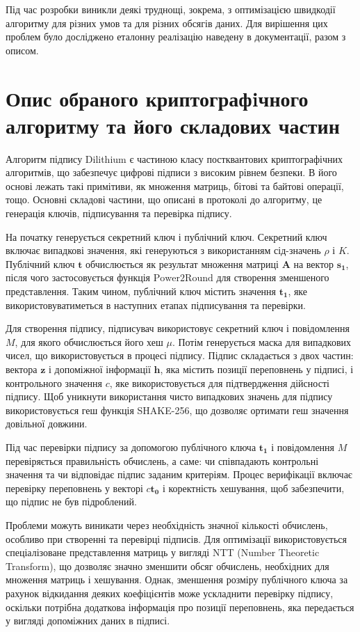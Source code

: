 \documentclass[12pt]{HomusWorkus}
\begin{document}
Під час розробки виникли деякі труднощі, зокрема, з оптимізацією швидкодії алгоритму для різних умов та для різних обсягів даних. Для вирішення цих проблем було досліджено еталонну реалізацію наведену в документації, разом з описом.

\section{Опис обраного криптографiчного алгоритму та його складових частин}

Алгоритм підпису Dilithium є частиною класу постквантових криптографічних алгоритмів, що забезпечує цифрові підписи з високим рівнем безпеки. В його основі лежать такі примітиви, як множення матриць, бітові та байтові операції, тощо. Основні складові частини, що описані в протоколі до алгоритму, це генерація ключів, підписування та перевірка підпису.

На початку генерується секретний ключ і публічний ключ. Секретний ключ включає випадкові значення, які генеруються з використанням сід-значень $\rho$ і $K$. Публічний ключ $\mathbf{t}$ обчислюється як результат множення матриці $\mathbf{A}$ на вектор $\mathbf{s_1}$, після чого застосовується функція $\mathrm{Power2Round}$ для створення зменшеного представлення. Таким чином, публічний ключ містить значення $\mathbf{t_1}$, яке використовуватиметься в наступних етапах підписування та перевірки.

Для створення підпису, підписувач використовує секретний ключ і повідомлення $M$, для якого обчислюється його хеш $\mu$. Потім генерується маска для випадкових чисел, що використовується в процесі підпису. Підпис складається з двох частин: вектора $\mathbf{z}$ і допоміжної інформації $\mathbf{h}$, яка містить позиції переповнень у підписі, і контрольного значення $c$, яке використовується для підтвердження дійсності підпису. Щоб уникнути використання чисто випадкових значень для підпису використовується геш функція SHAKE-256, що дозволяє ортимати геш значення довільної довжини.

Під час перевірки підпису за допомогою публічного ключа $\mathbf{t_1}$ і повідомлення $M$ перевіряється правильність обчислень, а саме: чи співпадають контрольні значення та чи відповідає підпис заданим критеріям. Процес верифікації включає перевірку переповнень у векторі $c\mathbf{t_0}$ і коректність хешування, щоб забезпечити, що підпис не був підроблений.

Проблеми можуть виникати через необхідність значної кількості обчислень, особливо при створенні та перевірці підписів. Для оптимізації використовується спеціалізоване представлення матриць у вигляді NTT (Number Theoretic Transform), що дозволяє значно зменшити обсяг обчислень, необхідних для множення матриць і хешування. Однак, зменшення розміру публічного ключа за рахунок відкидання деяких коефіцієнтів може ускладнити перевірку підпису, оскільки потрібна додаткова інформація про позиції переповнень, яка передається у вигляді допоміжних даних в підписі.
\end{document}
